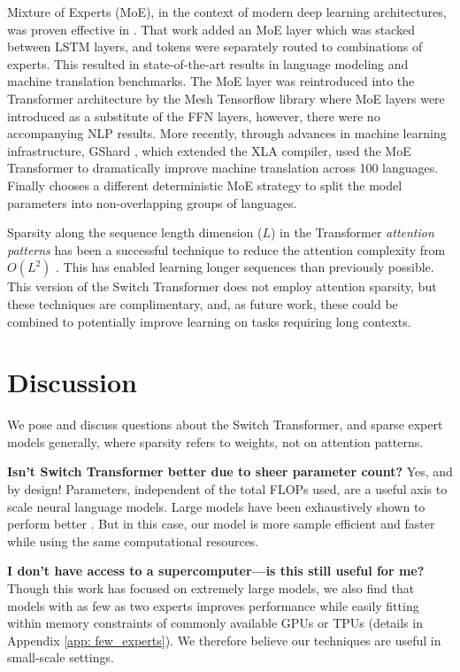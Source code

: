 \documentclass[twoside,11pt]{article}
\begin{document}
Mixture of Experts (MoE), in the context of modern deep learning architectures, was proven effective in \citet{shazeer2017outrageously}.
That work added an MoE layer which was stacked between LSTM \citep{hochreiter1997long} layers, and tokens were separately routed to combinations of experts.
This resulted in state-of-the-art results in language modeling and machine translation benchmarks.
The MoE layer was reintroduced into the Transformer architecture by the Mesh Tensorflow library \citep{shazeer2018mesh} where MoE layers were introduced as a substitute of the FFN layers, however, there were no accompanying NLP results.
More recently, through advances in machine learning infrastructure, GShard \citep{lepikhin2020gshard}, which extended the XLA compiler, used the MoE Transformer to dramatically improve machine translation across 100 languages.
Finally \cite{fan2021beyond} chooses a different deterministic MoE strategy to split the model parameters into non-overlapping groups of languages.

Sparsity along the sequence length dimension ($L$) in the Transformer \emph{attention patterns} has been a successful technique to reduce the attention complexity from $O(L^2)$ \citep{child2019generating,correia2019adaptively,sukhbaatar2019adaptive, kitaev2020reformer, zaheer2020big, beltagy2020longformer}. This has enabled learning longer sequences than previously possible. This version of the Switch Transformer does not employ attention sparsity, but these techniques are complimentary, and, as future work, these could be combined to potentially improve learning on tasks requiring long contexts.

\section{Discussion}
We pose and discuss questions about the Switch Transformer, and sparse expert models generally, where sparsity refers to weights, not on attention patterns.

\textbf{Isn't Switch Transformer better due to sheer parameter count?} Yes, and by design! Parameters, independent of the total FLOPs used, are a useful axis to scale neural language models. Large models have been exhaustively shown to perform better \citep{kaplan2020scaling}. But in this case, our model is more sample efficient and faster while using the same computational resources.

\textbf{I don't have access to a supercomputer---is this still useful for me?}
Though this work has focused on extremely large models, we also find that models with as few as two experts improves performance while easily fitting within memory constraints of commonly available GPUs or TPUs (details in Appendix \ref{app: few_experts}).
We therefore believe our techniques are useful in small-scale settings.
\end{document}
